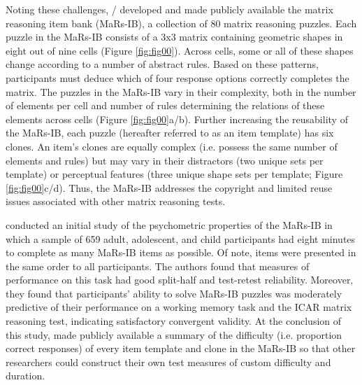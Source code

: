 \documentclass[a4paper,man,natbib,noextraspace]{apa6}
\begin{document}
Noting these challenges, \cite{knoll2016window} / \cite{chierchia2019matrix} developed and made publicly available the matrix reasoning item bank (MaRs-IB), a collection of 80 matrix reasoning puzzles. Each puzzle in the MaRs-IB consists of a 3x3 matrix containing geometric shapes in eight out of nine cells (Figure \ref{fig:fig00}). Across cells, some or all of these shapes change according to a number of abstract rules. Based on these patterns, participants must deduce which of four response options correctly completes the matrix. The puzzles in the MaRs-IB vary in their complexity, both in the number of elements per cell and number of rules determining the relations of these elements across cells (Figure \ref{fig:fig00}a/b). Further increasing the reusability of the MaRs-IB, each puzzle (hereafter referred to as an item template) has six clones. An item's clones are equally complex (i.e. possess the same number of elements and rules) but may vary in their distractors (two unique sets per template) or perceptual features (three unique shape sets per template; Figure \ref{fig:fig00}c/d). Thus, the MaRs-IB addresses the copyright and limited reuse issues associated with other matrix reasoning tests.   

\cite{chierchia2019matrix} conducted an initial study of the psychometric properties of the MaRs-IB in which a sample of 659 adult, adolescent, and child participants had eight minutes to complete as many MaRs-IB items as possible. Of note, items were presented in the same order to all participants. The authors found that measures of performance on this task had good split-half and test-retest reliability. Moreover, they found that participants' ability to solve MaRs-IB puzzles was moderately predictive of their performance on a working memory task and the ICAR matrix reasoning test, indicating satisfactory convergent validity. At the conclusion of this study, \cite{chierchia2019matrix} made publicly available a summary of the difficulty (i.e. proportion correct responses) of every item template and clone in the MaRs-IB so that other researchers could construct their own test measures of custom difficulty and duration.
\end{document}

